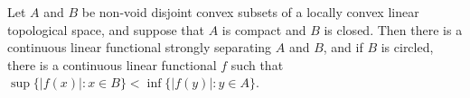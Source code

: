 Let $A$ and $B$ be non-void disjoint convex subsets of a locally convex linear topological space, and suppose that $A$ is compact and $B$ is closed. Then there is a continuous linear functional strongly separating $A$ and $B$, and if $B$ is circled, there is a continuous linear functional $f$ such that $\sup \{|f(x)|: x \in B\} < \inf \{|f(y)|: y \in A\}$.

